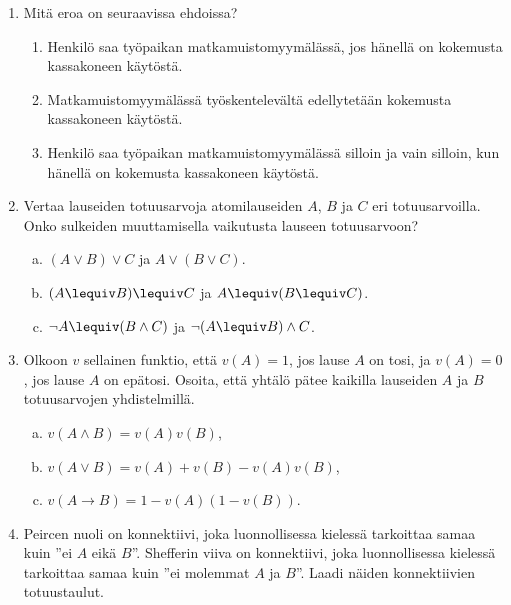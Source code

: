 \begin{enumerate}
\item
Mitä eroa on seuraavissa ehdoissa?
\begin{enumerate}
\item Henkilö saa työpaikan matkamuistomyymälässä, jos hänellä on kokemusta kassakoneen käytöstä.
\item Matkamuistomyymälässä työskentelevältä edellytetään kokemusta kassakoneen käytöstä.
\item 
Henkilö saa työpaikan matkamuistomyymälässä silloin ja vain silloin, kun hänellä on kokemusta kassakoneen käytöstä.
\end{enumerate}


\item
Vertaa lauseiden totuusarvoja atomilauseiden $A$, $B$ ja $C$ eri totuusarvoilla. Onko sulkeiden muuttamisella vaikutusta lauseen totuusarvoon?

\begin{enumerate}[a)]

\item $(A\lor B)\lor C$ ja $A\lor (B\lor C)$.

\item $(A\lequiv B)\lequiv C$ ja $A\lequiv (B\lequiv C)$.

\item $\lnot A \lequiv (B \land C)$ ja $\lnot (A \lequiv B) \land C$.

\end{enumerate}


\item
Olkoon $v$ sellainen funktio, että $v(A) = 1$, jos lause $A$ on tosi, ja $v(A) = 0$, jos lause $A$ on epätosi. Osoita, että yhtälö pätee kaikilla lauseiden $A$ ja $B$ totuusarvojen yhdistelmillä.

\begin{enumerate}[a)]
\item $v(A\land B)=v(A)v(B)$,
\item $v(A\lor B)=v(A)+v(B)- v(A)v(B)$,
\item $v(A\to B)=1-v(A)(1-v(B))$.
\end{enumerate}

\item
Peircen nuoli on konnektiivi, joka luonnollisessa kielessä tarkoittaa samaa kuin ''ei $A$ eikä $B$''. Shefferin viiva on konnektiivi, joka luonnollisessa kielessä tarkoittaa samaa kuin ''ei molemmat $A$ ja $B$''. Laadi näiden konnektiivien totuustaulut. 
\end{enumerate}

